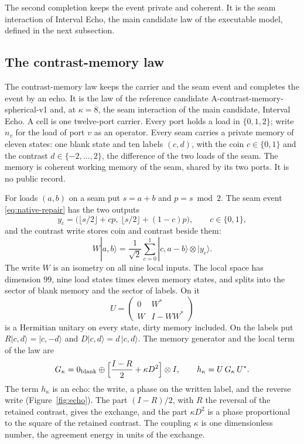 \documentclass[11pt]{article}
\theoremstyle{definition}
\theoremstyle{remark}
\begin{document}
The second completion keeps the event private and coherent. It is the seam
interaction of Interval Echo, the main candidate law of the executable model,
defined in the next subsection.

\subsection{The contrast-memory law}
\label{sec:contrast-memory}

The contrast-memory law keeps the carrier and the seam event and completes
the event by an echo. It is the law of the reference candidate
A-contrast-memory-spherical-v1 and, at $\kappa=8$, the seam interaction of
the main candidate, Interval Echo. A cell is one twelve-port carrier. Every port
holds a load in $\{0,1,2\}$; write $n_v$ for the load of port $v$ as an
operator. Every seam carries a private memory of eleven states: one blank
state and ten labels $(c,d)$, with the coin $c\in\{0,1\}$ and the contrast
$d\in\{-2,\dots,2\}$, the difference of the two loads of the seam. The
memory is coherent working memory of the seam, shared by its two ports.
It is no public record.

For loads $(a,b)$ on a seam put $s=a+b$ and $p=s\bmod2$. The seam event
\eqref{eq:native-repair} has the two outputs
\begin{equation}
 y_c=\bigl(\lfloor s/2\rfloor+cp,\ \lfloor s/2\rfloor+(1-c)p\bigr),
 \qquad c\in\{0,1\},
\label{eq:seam-outputs}
\end{equation}
and the contrast write stores coin and contrast beside them:
\begin{equation}
 W|a,b\rangle=\frac1{\sqrt2}\sum_{c=0}^{1}|c,a-b\rangle\otimes|y_c\rangle .
\label{eq:contrast-write}
\end{equation}
The write $W$ is an isometry on all nine local inputs. The local space has
dimension $99$, nine load states times eleven memory states, and splits
into the sector of blank memory and the sector of labels. On it
\begin{equation}
 U=\begin{pmatrix}0&W^{*}\\ W&I-WW^{*}\end{pmatrix}
\label{eq:echo-unitary}
\end{equation}
is a Hermitian unitary on every state, dirty memory included. On the
labels put $R|c,d\rangle=|c,-d\rangle$ and $D|c,d\rangle=d\,|c,d\rangle$.
The memory generator and the local term of the law are
\begin{equation}
 G_\kappa=0_{\rm blank}\oplus\Bigl[\frac{I-R}{2}+\kappa D^2\Bigr]\otimes I,
 \qquad h_\kappa=U\,G_\kappa\,U^{*}.
\label{eq:echo-term}
\end{equation}
The term $h_\kappa$ is an echo: the write, a phase on the written label,
and the reverse write (Figure~\ref{fig:echo}). The part $(I-R)/2$, with
$R$ the reversal of the retained contrast, gives the exchange, and the
part $\kappa D^2$ is a phase proportional to the square of the retained
contrast. The coupling $\kappa$ is one dimensionless number, the agreement
energy in units of the exchange.
\end{document}
